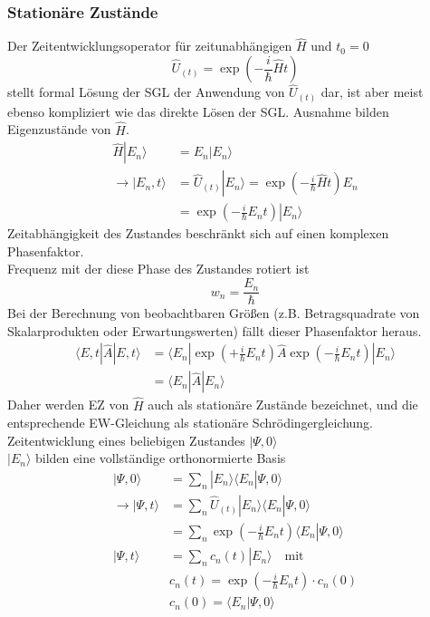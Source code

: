 \documentclass[10pt,article,colorback,accentcolor=tud9d]{scrartcl}
\begin{document}
\subsubsection{Stationäre Zustände}
Der Zeitentwicklungsoperator für zeitunabhängigen $\hat{H}$ und $t_0=0$
\begin{equation}
\hat{U}_{(t)}=\exp\left(-\frac{i}{\hbar}\hat{H}t\right)
\end{equation}
stellt formal Lösung der SGL der Anwendung von $\hat{U}_{(t)}$ dar, ist aber meist ebenso kompliziert wie das direkte Lösen der SGL. Ausnahme bilden Eigenzustände von $\hat{H}$.
\begin{align}
\hat{H}\left.\right|E_n\rangle&=E_n\left.\right|E_n\rangle\\
\rightarrow \left.\right|E_n,t\rangle&=\hat{U}_{(t)}\left.\right|E_n\rangle=\exp\left(-\frac{i}{\hbar}\hat{H}t\right)E_n\\
&=\exp\left(-\frac{i}{\hbar}E_nt\right)\left.\right|E_n\rangle
\end{align}
Zeitabhängigkeit des Zustandes beschränkt sich auf einen komplexen Phasenfaktor. \\
Frequenz mit der diese Phase des Zustandes rotiert ist
\begin{equation}
w_n=\frac{E_n}{\hbar}
\end{equation}
Bei der Berechnung von beobachtbaren Größen (z.B. Betragsquadrate von Skalarprodukten  oder Erwartungswerten) fällt dieser Phasenfaktor heraus.
\begin{align}
\langle E,t\left.\right|\hat{A}\left.\right|E,t\rangle&=\langle E_n \left.\right|\exp\left(+\frac{i}{\hbar}E_nt\right)\hat{A}\exp\left(-\frac{i}{\hbar}E_nt\right)\left.\right|E_n\rangle\\
&=\langle E_n\left.\right|\hat{A}\left.\right|E_n\rangle
\end{align}
Daher werden EZ von $\hat{H}$ auch als stationäre Zustände bezeichnet, und die entsprechende EW-Gleichung als stationäre Schrödingergleichung.\\
Zeitentwicklung eines beliebigen Zustandes $\left.\right|\Psi,0\rangle$\\
$\left.\right|E_n\rangle$ bilden eine vollständige orthonormierte Basis
\begin{align}
\left.\right|\Psi,0\rangle&=\sum_n\left.\right|E_n\rangle\langle E_n\left.\right|\Psi,0\rangle\\
\rightarrow \left.\right|\Psi,t\rangle&=\sum_n\hat{U}_{(t)}\left.\right|E_n\rangle\langle E_n\left.\right|\Psi,0\rangle\\
&=\sum_n\exp\left(-\frac{i}{\hbar}E_nt\right)\langle E_n \left.\right|\Psi,0\rangle\\
\left.\right|\Psi,t\rangle&=\sum_nc_n(t)\left.\right|E_n\rangle \quad \text{mit} \\
&c_n(t)=\exp\left(-\frac{i}{\hbar}E_nt\right)\cdot c_n(0)\\
&c_n(0)=\langle E_n\left.\right|\Psi,0\rangle
\end{align}
\end{document}
